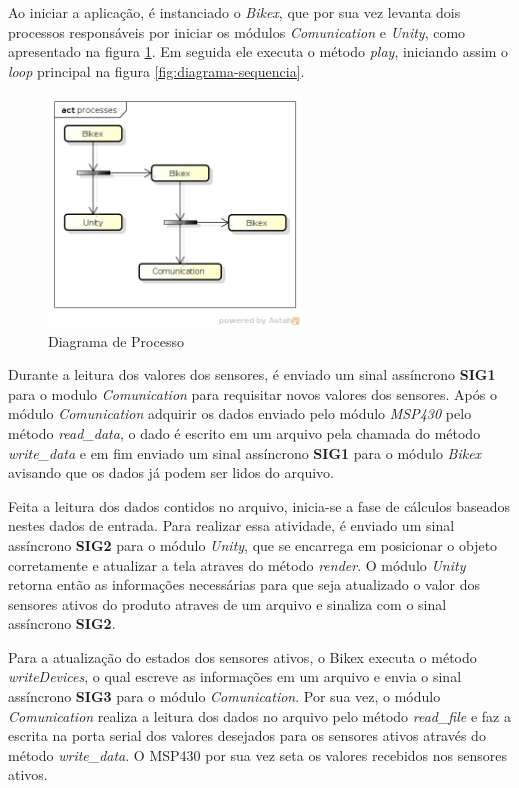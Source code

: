 
Ao iniciar a aplicação, é  instanciado o \textit{Bikex}, que por sua vez levanta dois processos responsáveis por iniciar os módulos \textit{Comunication} e \textit{Unity}, como apresentado na figura \ref{fig:diagrama-processo}. Em seguida ele executa o método \textit{play}, iniciando assim o \textit{loop} principal na figura \ref{fig:diagrama-sequencia}. 

\begin{figure}[h]
  \centering
	\includegraphics[width=0.6\textwidth]{figuras/processes}
  \caption{Diagrama de Processo}
  \label{fig:diagrama-processo}
\end{figure}


Durante a leitura dos valores dos sensores, é enviado um sinal assíncrono \textbf{SIG1} para o modulo \textit{Comunication}  para requisitar novos valores dos sensores. Após o módulo \textit{Comunication} adquirir os dados enviado pelo módulo \textit{MSP430} pelo método \textit{read\_data}, o dado é escrito em um arquivo pela chamada do método \textit{write\_data} e em fim enviado um sinal assíncrono \textbf{SIG1} para o módulo \textit{Bikex} avisando que os dados já podem ser lidos do arquivo.

Feita a leitura dos dados contidos no arquivo, inicia-se a fase de cálculos baseados nestes dados de entrada. Para realizar essa atividade, é enviado um sinal assíncrono \textbf{SIG2} para o módulo \textit{Unity}, que se encarrega em posicionar o objeto corretamente e atualizar a tela atraves do método \textit{render}. O módulo \textit{Unity} retorna então as informações necessárias para que seja atualizado o valor dos sensores ativos do produto atraves de um arquivo  e sinaliza com o sinal assíncrono \textbf{SIG2}.

Para a atualização do estados dos sensores ativos, o Bikex executa o método \textit{writeDevices}, o qual escreve as informações em um arquivo e envia o sinal assíncrono \textbf{SIG3} para o módulo \textit{Comunication}. Por sua vez, o módulo \textit{Comunication} realiza a leitura dos dados no arquivo pelo método \textit{read\_file} e  faz a escrita na porta serial dos valores desejados para os sensores ativos através do método \textit{write\_data}. O MSP430 por sua vez seta os valores recebidos nos sensores ativos.

